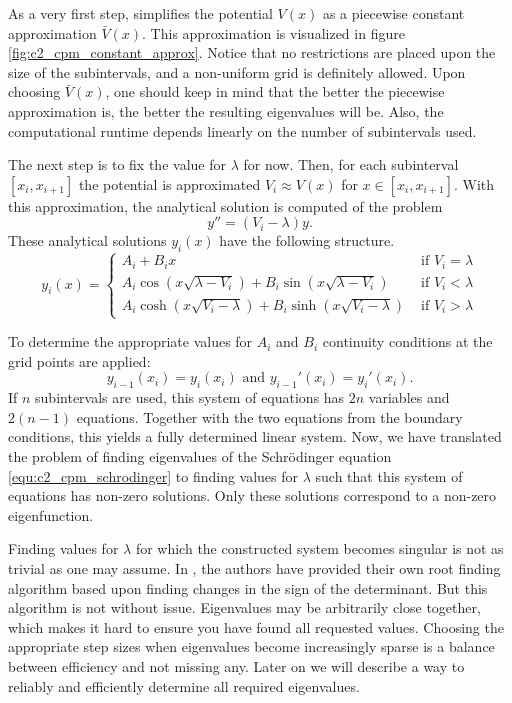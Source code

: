 As a very first step, \cite{canosa_new_1970} simplifies the potential $V(x)$ as a piecewise constant approximation $\bar{V}(x)$. This approximation is visualized in figure \ref{fig:c2_cpm_constant_approx}. Notice that no restrictions are placed upon the size of the subintervals, and a non-uniform grid is definitely allowed. Upon choosing $\bar{V}(x)$, one should keep in mind that the better the piecewise approximation is, the better the resulting eigenvalues will be. Also, the computational runtime depends linearly on the number of subintervals used.

The next step is to fix the value for $\lambda$ for now. Then, for each subinterval $[x_i, x_{i+1}]$ the potential is approximated $V_i \approx V(x)$ for $x \in [x_i, x_{i+1}]$. With this approximation, the analytical solution is computed of the problem
$$
    y'' = (V_i - \lambda) y\text{.}
$$
These analytical solutions $y_i(x)$ have the following structure.
$$
    y_i(x) = \begin{cases}
        A_i + B_i x                                                         & \text{ if $V_i = \lambda$} \\
        A_i \cos(x\sqrt{\lambda - V_i}) + B_i \sin(x\sqrt{\lambda - V_i})   & \text{ if $V_i < \lambda$} \\
        A_i \cosh(x\sqrt{V_i - \lambda}) + B_i \sinh(x\sqrt{V_i - \lambda}) & \text{ if $V_i > \lambda$}
    \end{cases}
$$

To determine the appropriate values for $A_i$ and $B_i$ continuity conditions at the grid points are applied:
$$
    y_{i-1}(x_i) = y_{i}(x_i) \text{ and } y_{i-1}'(x_i) = y_{i}'(x_i) \text{.}
$$
If $n$ subintervals are used, this system of equations has $2n$ variables and $2(n-1)$ equations. Together with the two equations from the boundary conditions, this yields a fully determined linear system. Now, we have translated the problem of finding eigenvalues of the Schrödinger equation \eqref{equ:c2_cpm_schrodinger} to finding values for $\lambda$ such that this system of equations has non-zero solutions. Only these solutions correspond to a non-zero eigenfunction.

Finding values for $\lambda$ for which the constructed system becomes singular is not as trivial as one may assume. In \cite{canosa_new_1970}, the authors have provided their own root finding algorithm based upon finding changes in the sign of the determinant. But this algorithm is not without issue. Eigenvalues may be arbitrarily close together, which makes it hard to ensure you have found all requested values. Choosing the appropriate step sizes when eigenvalues become increasingly sparse is a balance between efficiency and not missing any. Later on we will describe a way to reliably and efficiently determine all required eigenvalues.

